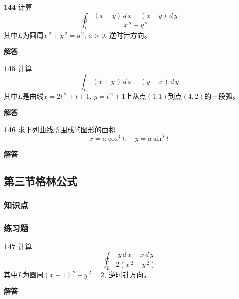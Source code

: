 \documentclass[a4paper,10pt]{article} %
\begin{document}

\textheight


\par\noindent \textbf{144} \quad 计算
$$ \oint_L \frac{(x+y)\,d\,x-(x-y)\,d\,y}{x\,^2+y\,^2}$$
其中$L$为圆周$x\,^2+y\,^2=a\,^2$, $a>0$, 逆时针方向。
\par\noindent \textbf{ 解答}




\textheight


\par\noindent \textbf{145} \quad 计算
$$ \int_L (x+y\,)\,d\,x+(y-x\,)\,d\,y$$
其中$L$是曲线$x=2t\,^2+t+1$, $y=t\,^2+1$上从点$(1,1)$到点$(4,2)$的一段弧。
\par\noindent \textbf{ 解答}




\textheight


\par\noindent \textbf{146} \quad 求下列曲线所围成的图形的面积
$$x=a\cos ^3 t,\quad y=a\sin ^3t$$
\par\noindent \textbf{ 解答}




\textheight


\newpage
\subsection{第三节\quad 格林公式}
\subsubsection{知识点}
\subsubsection{练习题}
\par\noindent \textbf{147} \quad 计算
$$ \oint_L \frac{y\,d\,x-x\,d\,y}{2(x\,^2+y\,^2)}$$
其中$L$为圆周$(x-1)\,^2+y\,^2=2$, 逆时针方向。
\par\noindent \textbf{ 解答}
\end{document}
